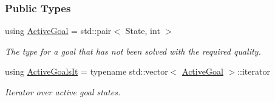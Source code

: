 \subsubsection*{Public Types}
\begin{DoxyCompactItemize}
\item 
using \hyperlink{structslb_1_1ext_1_1policy_1_1goalHandler_1_1MultipleGoal_ab5c8ba5693e69007544a7e9e4a48f7fa}{Active\+Goal} = std\+::pair$<$ State, int $>$\hypertarget{structslb_1_1ext_1_1policy_1_1goalHandler_1_1MultipleGoal_ab5c8ba5693e69007544a7e9e4a48f7fa}{}\label{structslb_1_1ext_1_1policy_1_1goalHandler_1_1MultipleGoal_ab5c8ba5693e69007544a7e9e4a48f7fa}

\begin{DoxyCompactList}\small\item\em The type for a goal that has not been solved with the required quality. \end{DoxyCompactList}\item 
using \hyperlink{structslb_1_1ext_1_1policy_1_1goalHandler_1_1MultipleGoal_a6cbdf80decb53458becf058bbaae6971}{Active\+Goals\+It} = typename std\+::vector$<$ \hyperlink{structslb_1_1ext_1_1policy_1_1goalHandler_1_1MultipleGoal_ab5c8ba5693e69007544a7e9e4a48f7fa}{Active\+Goal} $>$\+::iterator\hypertarget{structslb_1_1ext_1_1policy_1_1goalHandler_1_1MultipleGoal_a6cbdf80decb53458becf058bbaae6971}{}\label{structslb_1_1ext_1_1policy_1_1goalHandler_1_1MultipleGoal_a6cbdf80decb53458becf058bbaae6971}

\begin{DoxyCompactList}\small\item\em Iterator over active goal states. \end{DoxyCompactList}\end{DoxyCompactItemize}

